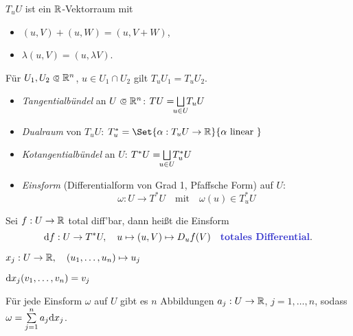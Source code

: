 \documentclass{cheat-sheet}
\theoremstyle{definition}
\begin{document}
\begin{bem}
  $T_u U$ ist ein $\mathbb{R}$-Vektorraum mit
  \begin{multicols}{2}
    \begin{itemize}
      \item $(u, V) + (u, W) = (u, V + W)$,
      \item $\lambda (u, V) = (u, \lambda V)$.
    \end{itemize}
  \end{multicols}
\end{bem}

\begin{bem}
  Für $U_1, U_2 \opn \R^n$, $u \in U_1 \cap U_2$ gilt $T_u U_1 = T_u U_2$.
\end{bem}

\begin{defn}
  \begin{itemize}
    \item \emph{Tangentialbündel} an $U \opn \R^n$: $TU = \bigsqcup_{\mathclap{u \in U}} T_u U$
    \item \emph{Dualraum} von $T_u U$: $T_u^* = \Set{ \alpha : T_u U \to \R }{ \alpha \text{ linear } }$
    \item \emph{Kotangentialbündel} an $U$: $T^* U = \bigsqcup_{\mathclap{u \in U}} T_u^* U$
    \item \emph{Einsform} (Differentialform von Grad 1, Pfaffsche Form) auf $U$:
\[ \omega : U \to T^*U \quad \text{mit} \quad \omega(u) \in T_u^*U \]
  \end{itemize}
\end{defn}


\begin{bsp}
  Sei $f : U \to \mathbb{R}$ total diff'bar, dann heißt die Einsform
  \[ \d f : U \to T^*U, \quad u \mapsto (u, V) \mapsto D_u f (V) \quad \text{\emph{totales Differential}.} \]
\end{bsp}

\begin{nota}
  $x_j : U \to \mathbb{R}, \quad (u_1, \ldots, u_n) \mapsto u_j$ %
\end{nota}

\begin{bem}
  $\mathrm{d} x_j (v_1, \ldots, v_n) = v_j$
\end{bem}


\iffalse %
\begin{beob}
  Für jede Einsform $\omega$ auf $U$ gibt es $n$ Abbildungen $a_j : U \to \mathbb{R}$, $j = 1, \ldots, n$, sodass $\omega = \sum_{j=1}^n a_j \d x_j$.
\end{beob}
\end{document}
